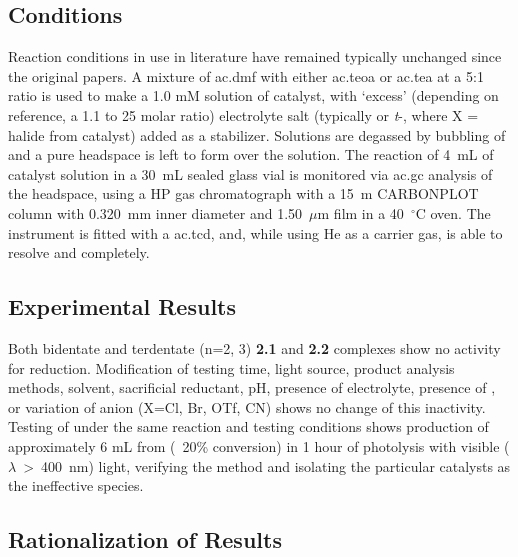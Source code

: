 \subsection{Conditions}

Reaction conditions in use in literature have remained typically unchanged since the original papers. A mixture of \gls{ac.dmf} with either \gls{ac.teoa} or \gls{ac.tea} at a 5:1 ratio is used to make a 1.0 mM solution of catalyst, with `excess' (depending on reference, a 1.1 to 25 molar ratio) electrolyte salt (typically  or \textit{t}-, where X = halide from catalyst) added as a stabilizer. Solutions are degassed by bubbling of  and a pure  headspace is left to form over the solution. The reaction of 4~mL of catalyst solution in a 30~mL sealed glass vial is monitored via \gls{ac.gc} analysis of the headspace, using a HP gas chromatograph with a 15~m CARBONPLOT column with 0.320~mm inner diameter and 1.50~$\mu$m film in a 40~$^\circ$C oven. The instrument is fitted with a \gls{ac.tcd}, and, while using He as a carrier gas, is able to resolve  and  completely.  

\subsection{Experimental Results}

Both bidentate and terdentate  (n=2, 3) \textbf{2.1} and \textbf{2.2} complexes show no activity for  reduction. Modification of testing time, light source, product analysis methods, solvent, sacrificial reductant, pH, presence of electrolyte, presence of , or variation of anion (X=Cl, Br, OTf, CN) shows no change of this inactivity. Testing of  under the same reaction and testing conditions shows production of approximately 6 mL  from  (~20\% conversion) in 1 hour of photolysis with visible ($\lambda$~\textgreater ~400~nm) light, verifying the method and isolating the particular catalysts as the ineffective species. 

\subsection{Rationalization of Results}\label{ss.rationalization}

